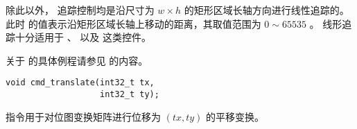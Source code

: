 除此以外， 追踪控制均是沿尺寸为 $w \times h$ 的矩形区域长轴方向进行线性追踪的。
此时  的值表示沿矩形区域长轴上移动的距离，其取值范围为 $0\sim65535$ 。
线形追踪十分适用于  、  以及  这类控件。

关于  的具体例程请参见  的内容。


\begin{framed}
\begin{verbatim}
void cmd_translate(int32_t tx,
                   int32_t ty);
\end{verbatim}
\end{framed}

 指令用于对位图变换矩阵进行位移为 $(tx, ty)$ 的平移变换。 
\fsixteen


